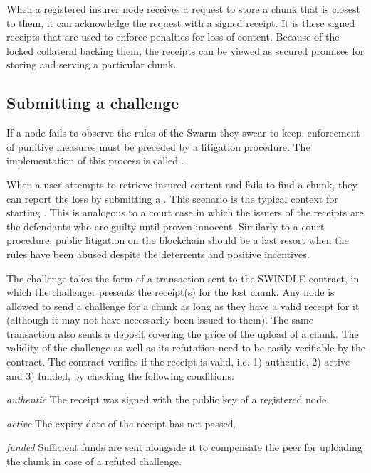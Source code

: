 When a registered insurer node receives a request to store a chunk that is closest to them, it can acknowledge the request with a signed receipt. It is these signed receipts that are used to enforce penalties for loss of content. Because of the locked collateral backing them, the receipts can be viewed as secured promises for storing and serving a particular chunk.



\subsection{Submitting a challenge}


If a node fails to observe the rules of the Swarm they swear to keep, enforcement of punitive measures must be preceded by a litigation procedure. The implementation of this process is called .

When a user attempts to retrieve insured content and fails to find a chunk, they can report the loss by submitting a . This scenario is the typical context for starting . This is analogous to a court case in which the issuers of the receipts are the defendants who are guilty until proven innocent. Similarly to a court procedure, public litigation on the blockchain should be a last resort when the rules have been abused despite the deterrents and positive incentives.


The challenge takes the form of a transaction sent to the SWINDLE contract, in which the challenger presents the receipt(s) for the lost chunk. Any node is allowed to send a challenge for a chunk as long as they have a valid receipt for it (although it may not have necessarily been issued to them). The same transaction also sends a deposit covering the price of the upload of a chunk. The validity of the challenge as well as its refutation need to be easily verifiable by the contract.
The contract verifies if the receipt is valid, i.e. 1) authentic, 2) active and 3) funded, by checking the following conditions:

\begin{labelledlist}
    
\item[\emph{authentic}]
The receipt was signed with the public key of a registered node.
\item[\emph{active}] The expiry date of the receipt has not passed.
\item[\emph{funded}] Sufficient funds are sent alongside it to compensate the peer for uploading the chunk in case of a refuted challenge.
\end{labelledlist}

